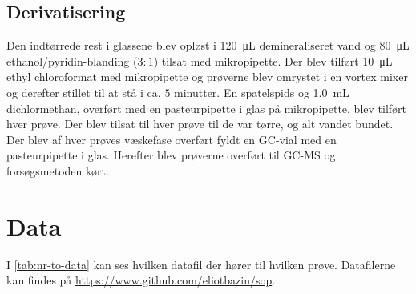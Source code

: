 \subsection{Derivatisering}
Den indtørrede rest i glassene blev opløst i \qty{120}{\micro\liter} demineraliseret vand og \qty{80}{\micro\liter} ethanol/pyridin-blanding ($3\!:\!1$) tilsat med mikropipette.
Der blev tilført \qty{10}{\micro\liter} ethyl chloroformat med mikropipette og prøverne blev omrystet i en vortex mixer og derefter stillet til at stå i ca. $5$ minutter.
En spatelspids  og \qty{1.0}{\milli\liter} dichlormethan, overført med en pasteurpipette i glas på mikropipette, blev tilført hver prøve.
Der blev tilsat  til hver prøve til de var tørre, og alt vandet bundet.
Der blev af hver prøves væskefase overført fyldt en GC-vial med en pasteurpipette i glas.
Herefter blev prøverne overført til GC-MS og forsøgsmetoden kørt.
\section{Data}
I \cref{tab:nr-to-data} kan ses hvilken datafil der hører til hvilken prøve. Datafilerne kan findes på \url{https://www.github.com/eliotbazin/sop}.

